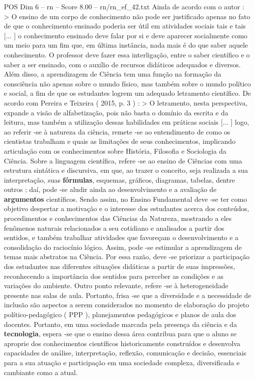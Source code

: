 \begin{textsample}{POS Dim 6 – rn – Score 8.00 – rn/rn\_ef\_42.txt}
Ainda de acordo com o autor : > O ensino de um corpo de conhecimento não pode ser justificado apenas no fato de que o conhecimento ensinado poderia ser útil em atividades sociais tais e tais [... ] o conhecimento ensinado deve falar por si e deve aparecer socialmente como um meio para um fim que, em última instância, nada mais é do que saber aquele conhecimento.
O professor deve fazer essa interligação, entre o saber científico e o saber a ser ensinado, com o auxílio de recursos didáticos adequados e diversos.
Além disso, a aprendizagem de Ciência tem uma função na formação da consciência não apenas sobre o mundo físico, mas também sobre o mundo político e social, a fim de que os estudantes logrem um adequado letramento científico.
De acordo com Pereira e Teixeira ( 2015, p. 3 ) : > O letramento, nesta perspectiva, expande a visão de alfabetização, pois não basta o domínio da escrita e da leitura, mas também a utilização dessas habilidades em práticas sociais [... ] logo, ao referir -se à natureza da ciência, remete -se ao entendimento de como os cientistas trabalham e quais as limitações de seus conhecimentos, implicando articulação com os conhecimentos sobre História, Filosofia e Sociologia da Ciência.
Sobre a linguagem científica, refere -se ao ensino de Ciências com uma estrutura sintática e discursiva, em que, ao trazer o conceito, seja realizada a sua interpretação, suas \textbf{fórmulas}, esquemas, gráficos, diagramas, tabelas, dentre outros ; daí, pode -se aludir ainda ao desenvolvimento e a avaliação de \textbf{argumentos} científicos.
Sendo assim, no Ensino Fundamental deve -se ter como objetivo despertar a motivação e o interesse dos estudantes acerca dos conteúdos, procedimentos e conhecimentos das Ciências da Natureza, mostrando a eles fenômenos naturais relacionados a seu cotidiano e analisados a partir dos sentidos, e também trabalhar atividades que favoreçam o desenvolvimento e a consolidação do raciocínio lógico.
Assim, pode -se estimular a aprendizagem de temas mais abstratos na Ciência.
Por essa razão, deve -se priorizar a participação dos estudantes nas diferentes situações didáticas a partir de suas impressões, reconhecendo a importância dos sentidos para perceber as condições e as variações do ambiente.
Outro ponto relevante, refere -se à heterogeneidade presente nas salas de aula.
Portanto, frisa -se que a diversidade e a necessidade de inclusão são aspectos a serem considerados no momento de elaboração do projeto político-pedagógico ( PPP ), planejamentos pedagógicos e planos de aula dos docentes.
Portanto, em uma sociedade marcada pela presença da ciência e da \textbf{tecnologia}, espera -se que o ensino dessa área contribua para que o aluno se aproprie dos conhecimentos científicos historicamente construídos e desenvolva capacidades de análise, interpretação, reflexão, comunicação e decisão, essenciais para a sua atuação e participação em uma sociedade complexa, diversificada e cambiante como a atual.

\end{textsample}
